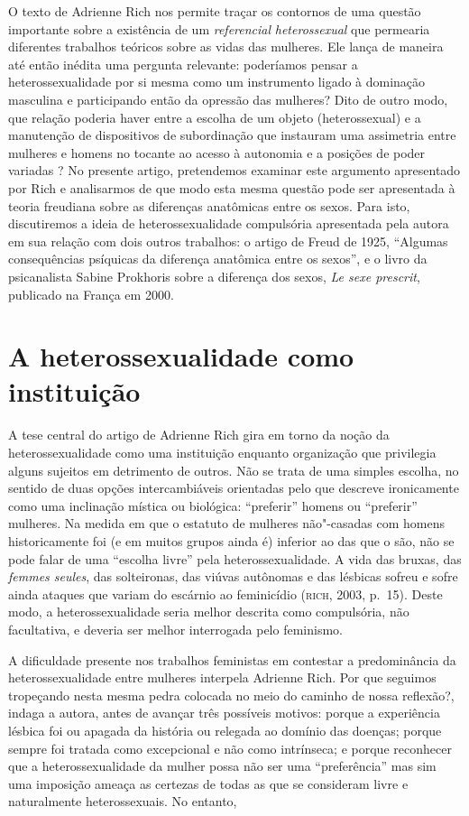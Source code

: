 O texto de Adrienne Rich nos permite traçar os contornos de uma questão
importante sobre a existência de um \emph{referencial}
\emph{heterossexual} que permearia diferentes trabalhos teóricos sobre
as vidas das mulheres. Ele lança de maneira até então inédita uma
pergunta relevante: poderíamos pensar a heterossexualidade por si mesma
como um instrumento ligado à dominação masculina e participando então da
opressão das mulheres? Dito de outro modo, que relação poderia haver
entre a escolha de um objeto (heterossexual) e a manutenção de
dispositivos de subordinação que instauram uma assimetria entre mulheres
e homens no tocante ao acesso à autonomia e a posições de poder variadas
? No presente artigo, pretendemos examinar este argumento apresentado
por Rich e analisarmos de que modo esta mesma questão pode ser
apresentada à teoria freudiana sobre as diferenças anatômicas entre os
sexos. Para isto, discutiremos a ideia de heterossexualidade compulsória
apresentada pela autora em sua relação com dois outros trabalhos: o
artigo de Freud de 1925, ``Algumas consequências psíquicas da diferença
anatômica entre os sexos'', e o livro da psicanalista Sabine Prokhoris
sobre a diferença dos sexos, \emph{Le sexe prescrit}, publicado na
França em 2000.

\section{A heterossexualidade como instituição}

A tese central do artigo de Adrienne Rich gira em torno da noção da
heterossexualidade como uma instituição enquanto organização que
privilegia alguns sujeitos em detrimento de outros. Não se trata de uma
simples escolha, no sentido de duas opções intercambiáveis orientadas
pelo que descreve ironicamente como uma inclinação mística ou biológica:
``preferir'' homens ou ``preferir'' mulheres. Na medida em que o
estatuto de mulheres não"-casadas com homens historicamente foi (e em
muitos grupos ainda é) inferior ao das que o são, não se pode falar de
uma ``escolha livre'' pela heterossexualidade. A vida das bruxas, das
\emph{femmes seules}, das solteironas, das viúvas autônomas e das
lésbicas sofreu e sofre ainda ataques que variam do escárnio ao
feminicídio (\textsc{rich}, 2003, p.~15). Deste modo, a
heterossexualidade seria melhor descrita como compulsória, não
facultativa, e deveria ser melhor interrogada pelo feminismo.

A dificuldade presente nos trabalhos feministas em contestar a
predominância da heterossexualidade entre mulheres interpela Adrienne
Rich. Por que seguimos tropeçando nesta mesma pedra colocada no meio do
caminho de nossa reflexão?, indaga a autora, antes de avançar três
possíveis motivos: porque a experiência lésbica foi ou apagada da
história ou relegada ao domínio das doenças; porque sempre foi tratada
como excepcional e não como intrínseca; e porque reconhecer que a
heterossexualidade da mulher possa não ser uma ``preferência'' mas sim
uma imposição ameaça as certezas de todas as que se consideram livre e
naturalmente heterossexuais. No entanto,

